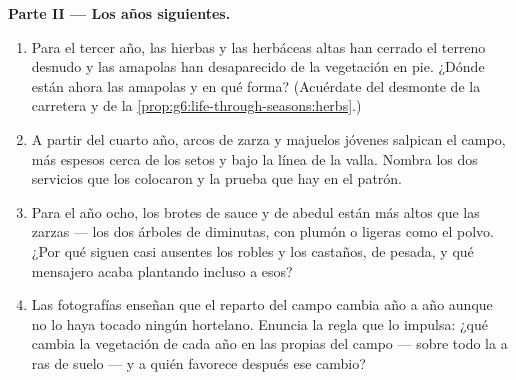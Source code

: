 \begin{problem}
\medskip\noindent\textbf{Parte II --- Los años siguientes.}
\begin{enumerate}[resume]
  \item Para el tercer año, las hierbas y las herbáceas altas han
        cerrado el terreno desnudo y las amapolas han desaparecido de
        la vegetación en pie. ¿Dónde están ahora las amapolas y en qué
        forma? (Acuérdate del desmonte de la carretera y de la
        \cref{prop:g6:life-through-seasons:herbs}.)
  \item A partir del cuarto año, arcos de zarza y majuelos jóvenes
        salpican el campo, más espesos cerca de los setos y bajo la
        línea de la valla. Nombra los dos servicios que los colocaron y
        la prueba que hay en el patrón.
  \item Para el año ocho, los brotes de sauce y de abedul están más
        altos que las zarzas --- los dos árboles de  diminutas,
        con plumón o ligeras como el polvo. ¿Por qué siguen casi
        ausentes los robles y los castaños, de  pesada, y qué
        mensajero  acaba plantando incluso a esos?
  \item Las fotografías enseñan que el reparto del campo cambia año a
        año aunque no lo haya tocado ningún hortelano. Enuncia la regla
        que lo impulsa: ¿qué cambia la vegetación de cada año en las
        propias  del campo --- sobre todo la  a ras de
        suelo --- y a quién favorece después ese cambio?
\end{enumerate}


\end{problem}
